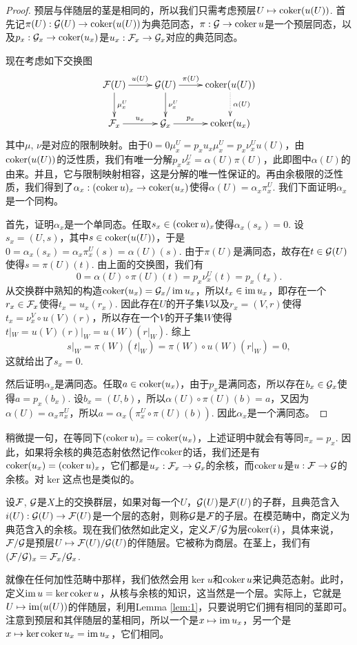 \begin{proof}
预层与伴随层的茎是相同的，所以我们只需考虑预层$U\mapsto \operatorname{coker}(u(U))$. 首先记$\pi(U):\mathcal{G}(U)\to \operatorname{coker} (u(U))$为典范同态，$\pi:\mathcal{G}\to \operatorname{coker} u$是一个预层同态，以及$p_x:\mathcal{G}_x\to \operatorname{coker}(u_x)$是$u_x:\mathcal{F}_x\to\mathcal{G}_x$对应的典范同态。

现在考虑如下交换图
\[
	\xymatrix{
	\calf(U)\ar[r]^{u(U)}\ar[d]^{\mu^U_x}&\calg(U)\ar[r]^-{\pi(U)}\ar[d]^{\nu^U_x}&\coker (u(U))\ar@{.>}[d]^{\alpha(U)}\\
	\calf_x\ar[r]^{u_x}&\calg_x\ar[r]^-{p_x}&\coker (u_x)
	}
\]
其中$\mu$, $\nu$是对应的限制映射。由于$0=0\mu^U_x=p_xu_x\mu^U_x=p_x\nu^U_xu(U)$，由$\operatorname{coker}(u(U))$的泛性质，我们有唯一分解$p_x\nu^U_x=\alpha(U)\pi(U)$，此即图中$\alpha(U)$的由来。并且，它与限制映射相容，这是分解的唯一性保证的。再由余极限的泛性质，我们得到了$\alpha_x:(\operatorname{coker} u)_x\to \operatorname{coker} (u_x)$使得$\alpha(U)=\alpha_x\pi^U_x$. 我们下面证明$\alpha_x$是一个同构。

首先，证明$\alpha_x$是一个单同态。任取$s_x\in (\operatorname{coker} u)_x$使得$\alpha_x(s_x)=0$. 设$s_x=(U,s)$，其中$s\in \operatorname{coker} (u(U))$，于是$0=\alpha_x(s_x)=\alpha_x \pi_x^U(s)=\alpha(U)(s)$. 由于$\pi(U)$是满同态，故存在$t\in \mathcal{G}(U)$使得$s=\pi(U)(t)$. 由上面的交换图，我们有
\[
	0=\alpha(U)\circ \pi(U)(t)=p_x\nu_x^U(t)=p_x(t_x).
\]
从交换群中熟知的构造$\operatorname{coker}(u_x)=\mathcal{G}_x/\operatorname{im} u_x$，所以$t_x\in \operatorname{im} u_x$，即存在一个$r_x\in \mathcal{F}_x$使得$t_x=u_x(r_x)$. 因此存在$U$的开子集$V$以及$r_x=(V,r)$使得$t_x=\nu_x^V\circ u(V)(r)$，所以存在一个$V$的开子集$W$使得$t|_W=u(V)(r)|_W=u(W)(r|_W)$. 综上
\[
	s|_W=\pi(W)(t|_W)=\pi(W)\circ u(W)(r|_W)=0,
\]
这就给出了$s_x=0$.

然后证明$\alpha_x$是满同态。任取$a\in \operatorname{coker}(u_x)$，由于$p_x$是满同态，所以存在$b_x\in\mathcal{G}_x$使得$a=p_x(b_x)$. 设$b_x=(U,b)$，所以$\alpha(U)\circ \pi(U)(b)=a$，又因为$\alpha(U)=\alpha_x\pi^U_x$，所以$a=\alpha_x\left(\pi^U_x\circ \pi(U)(b)\right)$. 因此$\alpha_x$是一个满同态。
\end{proof}

稍微提一句，在等同下$(\operatorname{coker} u)_x=\operatorname{coker}(u_x)$，上述证明中就会有等同$\pi_x=p_x$. 因此，如果将余核的典范态射依然记作$\operatorname{coker}$的话，我们还是有$\operatorname{coker}(u_x)=(\operatorname{coker} u)_x$，它们都是$u_x:\mathcal{F}_x\to\mathcal{G}_x$的余核，而$\operatorname{coker} u$是$u:\mathcal{F} \to \mathcal{G}$的余核。对$\ker$这点也是类似的。

\begin{para}[商层]\label{qsheaf}
设$\mathcal{F}$, $\mathcal{G}$是$X$上的交换群层，如果对每一个$U$，$\mathcal{G}(U)$是$\mathcal{F}(U)$的子群，且典范含入$i(U):\mathcal{G}(U)\to\mathcal{F}(U)$是一个层的态射，则称$\mathcal{G}$是$\mathcal{F}$的子层。在模范畴中，商定义为典范含入的余核。现在我们依然如此定义，定义$\mathcal{F}/\mathcal{G}$为层$\operatorname{coker}(i)$，具体来说，$\mathcal{F}/\mathcal{G}$是预层$U\mapsto \mathcal{F}(U)/\mathcal{G}(U)$的伴随层。它被称为商层。在茎上，我们有$(\mathcal{F}/\mathcal{G})_x=\mathcal{F}_x/\mathcal{G}_x$.

就像在任何加性范畴中那样，我们依然会用$\ker u$和$\operatorname{coker} u$来记典范态射。此时，定义$\operatorname{im} u=\ker\operatorname{coker} u$，从核与余核的知识，这当然是一个层。实际上，它就是$U\mapsto \operatorname{im}(u(U))$的伴随层，利用Lemma \ref{lem:1}，只要说明它们拥有相同的茎即可。注意到预层和其伴随层的茎相同，所以一个是$x\mapsto \operatorname{im} u_x$，另一个是$x\mapsto \ker\operatorname{coker} u_x=\operatorname{im} u_x$，它们相同。
\end{para}

